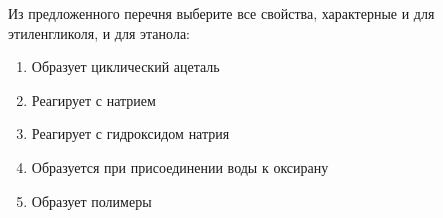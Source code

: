 Из предложенного перечня выберите все свойства, характерные и для этиленгликоля, и для этанола:
\\
\begin{enumerate} 
\item Образует циклический ацеталь
\item Реагирует с натрием
\item Реагирует с гидроксидом натрия
\item Образуется при присоединении воды к оксирану
\item Образует полимеры

\end{enumerate}

